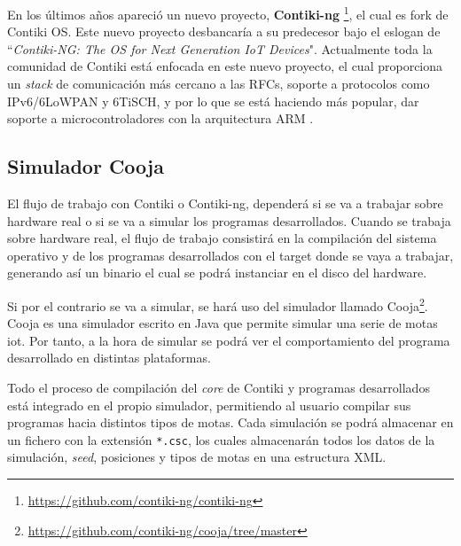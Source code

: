 En los últimos años apareció un nuevo proyecto, \textbf{Contiki-ng} \footnote{\url{https://github.com/contiki-ng/contiki-ng}}, el cual es fork de Contiki OS. Este nuevo proyecto desbancaría a su predecesor bajo el eslogan de ``\textit{Contiki-NG: The OS for Next Generation IoT Devices}". Actualmente toda la comunidad de Contiki está enfocada en este nuevo proyecto, el cual proporciona un \textit{stack} de comunicación más cercano a las RFCs, soporte a protocolos como IPv6/6LoWPAN y 6TiSCH, y por lo que se está haciendo más popular, dar soporte a microcontroladores con la arquitectura ARM \cite{kurniawan2018practical}.
\vspace{0.5cm}


\subsection{Simulador Cooja}

El flujo de trabajo con Contiki o Contiki-ng, dependerá si se va a trabajar sobre hardware real o si se va a simular los programas desarrollados. Cuando se trabaja sobre hardware real, el flujo de trabajo consistirá en la compilación del sistema operativo y de los programas desarrollados con el target donde se vaya a trabajar, generando así un binario el cual se podrá instanciar en el disco del hardware. \\

\par
Si por el contrario se va a simular, se hará uso del simulador llamado Cooja\footnote{\url{https://github.com/contiki-ng/cooja/tree/master}}. Cooja es una simulador escrito en Java que permite simular una serie de motas \gls{iot}. Por tanto, a la hora de simular se podrá ver el comportamiento del programa desarrollado en distintas plataformas. \\
\par

Todo el proceso de compilación del \textit{core} de Contiki y programas desarrollados está integrado en el propio simulador, permitiendo al usuario compilar sus programas hacia distintos tipos de motas. Cada simulación se podrá almacenar en un fichero con la extensión \texttt{*.csc}, los cuales almacenarán todos los datos de la simulación, \textit{seed}, posiciones y tipos de motas en una estructura XML. \\
\par


